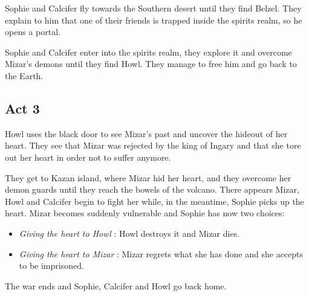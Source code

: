 Sophie and Calcifer fly towards the Southern desert until they find Belzel. They explain to him that one of their friends is trapped inside the spirits realm, so he opens a portal.

Sophie and Calcifer enter into the spirits realm, they explore it and overcome Mizar's demons until they find Howl. They manage to free him and go back to the Earth.

\subsection*{Act 3}

Howl uses the black door to see Mizar’s past and uncover the hideout of her heart. They see that Mizar was rejected by the king of Ingary and that she tore out her heart in order not to suffer anymore.

They get to Kazan island, where Mizar hid her heart, and they overcome her demon guards until they reach the bowels of the volcano. There appears Mizar, Howl and Calcifer begin to fight her while, in the meantime, Sophie picks up the heart. Mizar becomes suddenly vulnerable and Sophie has now two choices:
\begin{itemize}
\item \textit{Giving the heart to Howl} : Howl destroys it and Mizar dies.
\item \textit{Giving the heart to Mizar} : Mizar regrets what she has done and she accepts to be imprisoned.
\end{itemize} 

The war ends and Sophie, Calcifer and Howl go back home.